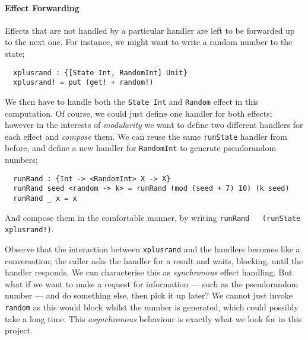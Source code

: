 \documentclass[msc,deptreport,cs]{infthesis} %
\newcommand{\code}[1]{\lstinline{#1}}
\begin{document}


\paragraph*{Effect Forwarding}

Effects that are not handled by a particular handler are left to be forwarded up
to the next one. For instance, we might want to write a random number to the
state;

\begin{lstlisting}
  xplusrand : {[State Int, RandomInt] Unit}
  xplusrand! = put (get! + random!)
\end{lstlisting}

\noindent We then have to handle both the \code{State Int} and \code{Random}
effect in this computation. Of course, we could just define one handler for both
effects; however in the interests of \emph{modularity} we want to define two
different handlers for each effect and \emph{compose} them. We can reuse the
same \code{runState} handler from before, and define a new handler for
\code{RandomInt} to generate pseudorandom numbers;

\begin{lstlisting}
  runRand : {Int -> <RandomInt> X -> X}
  runRand seed <random -> k> = runRand (mod (seed + 7) 10) (k seed)
  runRand _ x = x
\end{lstlisting}

\noindent And compose them in the comfortable manner, by writing \code{runRand
  (runState xplusrand!)}.

Observe that the interaction between \code{xplusrand} and the handlers becomes
like a conversation; the caller asks the handler for a result and waits,
blocking, until the handler responds. We can characterise this as
\emph{synchronous} effect handling. But what if we want to make a request for
information --- such as the pseudorandom number --- and do something else, then
pick it up later? We cannot just invoke \code{random} as this would block whilst
the number is generated, which could possibly take a long time. This
\emph{asynchronous} behaviour is exactly what we look for in this project.
\end{document}
